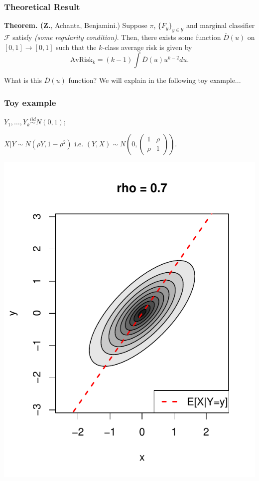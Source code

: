 \documentclass{beamer}
\begin{document}
\begin{frame}
\frametitle{Theoretical Result}

\textbf{Theorem. (Z.}, Achanta, Benjamini.)
Suppose $\pi$, $\{F_y\}_{y \in \mathcal{Y}}$ and marginal classifier
$\mathcal{F}$ satisfy \emph{(some regularity condition)}.  Then, 
there exists some function $\bar{D}(u)$ on $[0,1] \to [0,1]$ such that
the $k$-class average risk is given by
\begin{equation}\label{eq:avrisk_identity}
\text{AvRisk}_k = (k-1) \int \bar{D}(u) u^{k-2} du.
\end{equation}
\pause

\vspace{1in}
What is this $\bar{D}(u)$ function? We will explain in the following toy example...
\end{frame}

\begin{frame}
\frametitle{Toy example}
$Y_1,\hdots, Y_k \stackrel{iid}{\sim} N(0, 1);$\pause

$X|Y \sim N(\rho Y, 1-\rho^2)$ i.e. $(Y, X) \sim N(0, \begin{pmatrix}1 & \rho\\\rho & 1\end{pmatrix}).$

\begin{center}
\includegraphics[scale = 0.5, clip = true, trim = 0 0 0 0.5in]{../extrapolation/illus_rho_0_7.pdf}
\end{center}

\end{frame}
\end{document}
